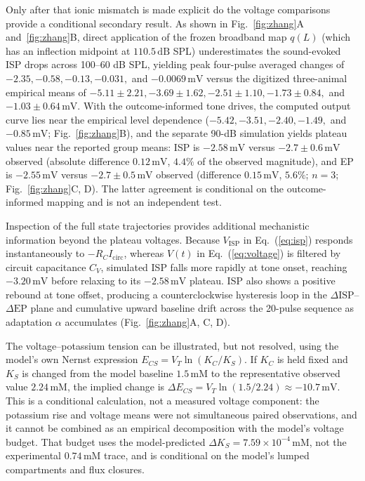 \documentclass[final,5p,times]{elsarticle}
\begin{document}
Only after that ionic mismatch is made explicit do the voltage comparisons provide a conditional secondary result. As shown in Fig.~\ref{fig:zhang}A and~\ref{fig:zhang}B, direct application of the frozen broadband map \(q(L)\) (which has an inflection midpoint at \(110.5\,\mathrm{dB}\) SPL) underestimates the sound-evoked ISP drops across 100--60 dB SPL, yielding peak four-pulse averaged changes of \(-2.35, -0.58, -0.13, -0.031,\) and \(-0.0069\,\mathrm{mV}\) versus the digitized three-animal empirical means of \(-5.11 \pm 2.21, -3.69 \pm 1.62, -2.51 \pm 1.10, -1.73 \pm 0.84,\) and \(-1.03 \pm 0.64\,\mathrm{mV}\). With the outcome-informed tone drives, the computed output curve lies near the empirical level dependence (\(-5.42, -3.51, -2.40, -1.49,\) and \(-0.85\,\mathrm{mV}\); Fig.~\ref{fig:zhang}B), and the separate 90-dB simulation yields plateau values near the reported group means: ISP is \(-2.58\,\mathrm{mV}\) versus \(-2.7 \pm 0.6\,\mathrm{mV}\) observed (absolute difference \(0.12\,\mathrm{mV}\), \(4.4\%\) of the observed magnitude), and EP is \(-2.55\,\mathrm{mV}\) versus \(-2.7 \pm 0.5\,\mathrm{mV}\) observed (difference \(0.15\,\mathrm{mV}\), \(5.6\%\); \(n=3\); Fig.~\ref{fig:zhang}C, D). The latter agreement is conditional on the outcome-informed mapping and is not an independent test.

Inspection of the full state trajectories provides additional mechanistic information beyond the plateau voltages. Because \(V_{\mathrm{ISP}}\) in Eq.~(\ref{eq:isp}) responds instantaneously to \(-R_C I_{\mathrm{circ}}\), whereas \(V(t)\) in Eq.~(\ref{eq:voltage}) is filtered by circuit capacitance \(C_V\), simulated ISP falls more rapidly at tone onset, reaching \(-3.20\,\mathrm{mV}\) before relaxing to its \(-2.58\,\mathrm{mV}\) plateau. ISP also shows a positive rebound at tone offset, producing a counterclockwise hysteresis loop in the \(\Delta\mathrm{ISP}\)--\(\Delta\mathrm{EP}\) plane and cumulative upward baseline drift across the 20-pulse sequence as adaptation \(\alpha\) accumulates (Fig.~\ref{fig:zhang}A, C, D).

The voltage--potassium tension can be illustrated, but not resolved, using the model's own Nernst expression \(E_{CS}=V_T\ln(K_C/K_S)\). If \(K_C\) is held fixed and \(K_S\) is changed from the model baseline \(1.5\,\mathrm{mM}\) to the representative observed value \(2.24\,\mathrm{mM}\), the implied change is \(\Delta E_{CS}=V_T\ln(1.5/2.24)\approx-10.7\,\mathrm{mV}\). This is a conditional calculation, not a measured voltage component: the potassium rise and voltage means were not simultaneous paired observations, and it cannot be combined as an empirical decomposition with the model's voltage budget. That budget uses the model-predicted \(\Delta K_S=7.59\times10^{-4}\,\mathrm{mM}\), not the experimental \(0.74\,\mathrm{mM}\) trace, and is conditional on the model's lumped compartments and flux closures.
\end{document}
